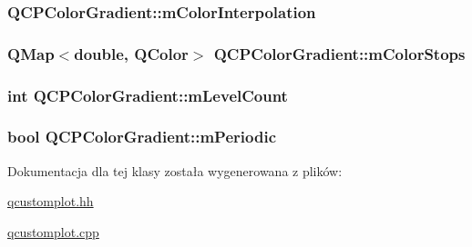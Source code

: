 \subsubsection[{\texorpdfstring{m\+Color\+Interpolation}{mColorInterpolation}}]{ Q\+C\+P\+Color\+Gradient\+::m\+Color\+Interpolation\hspace{0.3cm}{\ttfamily [protected]}}\hypertarget{class_q_c_p_color_gradient_a028cef73d863800a9ee93ffd641cce01}{}\label{class_q_c_p_color_gradient_a028cef73d863800a9ee93ffd641cce01}
\subsubsection[{\texorpdfstring{m\+Color\+Stops}{mColorStops}}]{\setlength{\rightskip}{0pt plus 5cm}Q\+Map$<$double, Q\+Color$>$ Q\+C\+P\+Color\+Gradient\+::m\+Color\+Stops\hspace{0.3cm}{\ttfamily [protected]}}\hypertarget{class_q_c_p_color_gradient_a9e11a2b0974ef289d12c324822bc3a3e}{}\label{class_q_c_p_color_gradient_a9e11a2b0974ef289d12c324822bc3a3e}
\subsubsection[{\texorpdfstring{m\+Level\+Count}{mLevelCount}}]{\setlength{\rightskip}{0pt plus 5cm}int Q\+C\+P\+Color\+Gradient\+::m\+Level\+Count\hspace{0.3cm}{\ttfamily [protected]}}\hypertarget{class_q_c_p_color_gradient_a98fb68e359904b2c991fcae3e38a211a}{}\label{class_q_c_p_color_gradient_a98fb68e359904b2c991fcae3e38a211a}
\subsubsection[{\texorpdfstring{m\+Periodic}{mPeriodic}}]{\setlength{\rightskip}{0pt plus 5cm}bool Q\+C\+P\+Color\+Gradient\+::m\+Periodic\hspace{0.3cm}{\ttfamily [protected]}}\hypertarget{class_q_c_p_color_gradient_a4b07deeb20ca1ee2d5ea7e01bf0420af}{}\label{class_q_c_p_color_gradient_a4b07deeb20ca1ee2d5ea7e01bf0420af}


Dokumentacja dla tej klasy została wygenerowana z plików\+:\begin{DoxyCompactItemize}
\item 
\hyperlink{qcustomplot_8hh}{qcustomplot.\+hh}\item 
\hyperlink{qcustomplot_8cpp}{qcustomplot.\+cpp}\end{DoxyCompactItemize}
